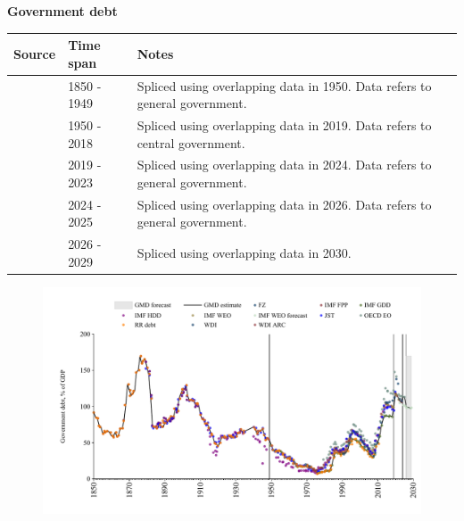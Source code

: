 \documentclass[12pt,a4paper,landscape]{article}
\begin{document}
\begin{adjustbox}{max totalsize={\paperwidth}{\paperheight},center}
\begin{minipage}[t][\textheight][t]{\textwidth}
\vspace*{0.5cm}
{}
\begin{center}
{\Large\bfseries Government debt}
\end{center}
\vspace{0.5cm}
\begin{table}[H]
\centering
\small
\begin{tabular}{|l|l|l|}
\hline
\textbf{Source} & \textbf{Time span} & \textbf{Notes} \\
\hline
\rowcolor{white}\cite{IMF_FPP}& 1850 - 1949 &Spliced using overlapping data in 1950. Data refers to general government.\\
\rowcolor{lightgray}\cite{IMF_GDD}& 1950 - 2018 &Spliced using overlapping data in 2019. Data refers to central government.\\
\rowcolor{white}\cite{IMF_FPP}& 2019 - 2023 &Spliced using overlapping data in 2024. Data refers to general government.\\
\rowcolor{lightgray}\cite{OECD_EO}& 2024 - 2025 &Spliced using overlapping data in 2026. Data refers to general government.\\
\rowcolor{white}\cite{IMF_WEO_forecast}& 2026 - 2029 &Spliced using overlapping data in 2030. \\
\hline
\end{tabular}
\end{table}
\begin{figure}[H]
\centering
\includegraphics[width=\textwidth,height=0.6\textheight,keepaspectratio]{graphs/ESP_govdebt_GDP.pdf}
\end{figure}
\end{minipage}
\end{adjustbox}
\end{document}
